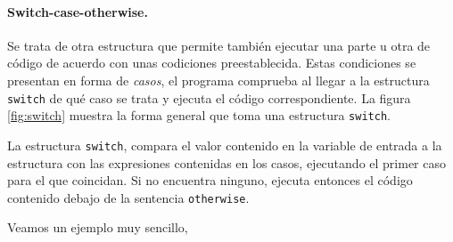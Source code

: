 




\paragraph{Switch-case-otherwise.} Se trata de otra estructura que permite también ejecutar una parte u otra de código de acuerdo con unas codiciones preestablecida. Estas condiciones se presentan en forma de \emph{casos}, el programa comprueba al llegar a la estructura \texttt{switch} de qué caso se trata y ejecuta el código correspondiente. La figura \ref{fig:switch} muestra la forma general que toma una estructura \texttt{switch}.

La estructura \texttt{switch}, compara el valor contenido en la variable de entrada a la estructura con las expresiones contenidas en los casos, ejecutando el primer caso para el que coincidan. Si no encuentra ninguno, ejecuta entonces el código contenido debajo de la sentencia \texttt{otherwise}.

Veamos un ejemplo muy sencillo,


  
